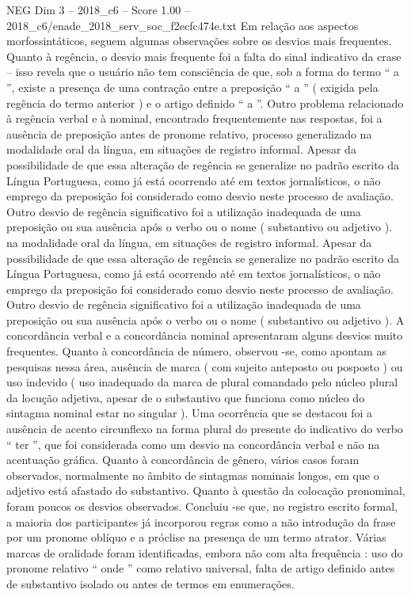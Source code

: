 \begin{textsample}{NEG Dim 3 – 2018\_c6 – Score 1.00 – 2018\_c6/enade\_2018\_serv\_soc\_f2ecfc474e.txt}
Em relação aos aspectos morfossintáticos, seguem algumas observações sobre os desvios mais frequentes.
Quanto à regência, o desvio mais frequente foi a falta do sinal indicativo da crase – isso revela que o usuário não tem consciência de que, sob a forma do termo “ a ”, existe a presença de uma contração entre a preposição “ a ” ( exigida pela regência do termo anterior ) e o artigo definido “ a ”.
Outro problema relacionado à regência verbal e à nominal, encontrado frequentemente nas respostas, foi a ausência de preposição antes de pronome relativo, processo generalizado na modalidade oral da língua, em situações de registro informal.
Apesar da possibilidade de que essa alteração de regência se generalize no padrão escrito da Língua Portuguesa, como já está ocorrendo até em textos jornalísticos, o não emprego da preposição foi considerado como desvio neste processo de avaliação.
Outro desvio de regência significativo foi a utilização inadequada de uma preposição ou sua ausência após o verbo ou o nome ( substantivo ou adjetivo ). na modalidade oral da língua, em situações de registro informal.
Apesar da possibilidade de que essa alteração de regência se generalize no padrão escrito da Língua Portuguesa, como já está ocorrendo até em textos jornalísticos, o não emprego da preposição foi considerado como desvio neste processo de avaliação.
Outro desvio de regência significativo foi a utilização inadequada de uma preposição ou sua ausência após o verbo ou o nome ( substantivo ou adjetivo ).
A concordância verbal e a concordância nominal apresentaram alguns desvios muito frequentes.
Quanto à concordância de número, observou -se, como apontam as pesquisas nessa área, ausência de marca ( com sujeito anteposto ou posposto ) ou uso indevido ( uso inadequado da marca de plural comandado pelo núcleo plural da locução adjetiva, apesar de o substantivo que funciona como núcleo do sintagma nominal estar no singular ).
Uma ocorrência que se destacou foi a ausência de acento circunflexo na forma plural do presente do indicativo do verbo “ ter ”, que foi considerada como um desvio na concordância verbal e não na acentuação gráfica.
Quanto à concordância de gênero, vários casos foram observados, normalmente no âmbito de sintagmas nominais longos, em que o adjetivo está afastado do substantivo.
Quanto à questão da colocação pronominal, foram poucos os desvios observados.
Concluiu -se que, no registro escrito formal, a maioria dos participantes já incorporou regras como a não introdução da frase por um pronome oblíquo e a próclise na presença de um termo atrator.
Várias marcas de oralidade foram identificadas, embora não com alta frequência : uso do pronome relativo “ onde ” como relativo universal, falta de artigo definido antes de substantivo isolado ou antes de termos em enumerações.

\end{textsample}
